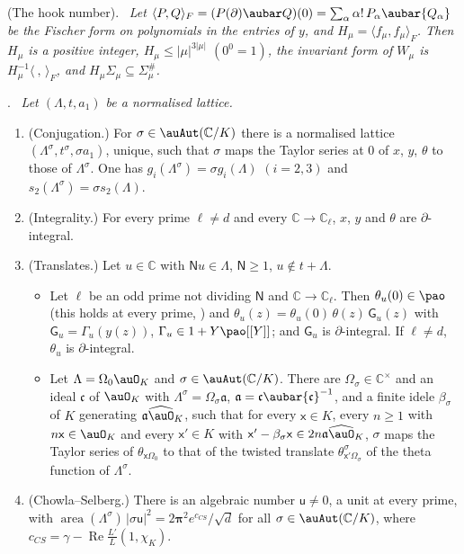 \documentclass[10pt]{amsart}
\theoremstyle{definition}
\theoremstyle{remark}
\newcommand{\C}{\mathbb C}
\newcommand{\Rel}{\operatorname{Re}}
\newenvironment{quotedthm}[2]{\par\medskip\noindent\begingroup
  \textbf{#1}#2.\ \itshape\ignorespaces}{\endgroup\par\medskip}
\begin{document}
\begin{quotedthm}{\cite[Lemma~5.22]{P49}}{ (The hook number)}
Let $\langle P,Q\rangle_F=(P(\partial)\aubar Q)(0)=\sum_\alpha\alpha!\,P_\alpha\aubar{Q_\alpha}$ be the
Fischer form on polynomials in the entries of $y$, and $H_\mu=\langle f_\mu,f_\mu\rangle_F$. Then
$H_\mu$ is a positive integer, $H_\mu\le|\mu|^{3|\mu|}$ $(0^0=1)$, the invariant form of $W_\mu$ is
$H_\mu^{-1}\langle\ ,\,\rangle_F$, and $H_\mu\Sigma_\mu\subseteq\Sigma_\mu^\#$.
\end{quotedthm}

\begin{quotedthm}{\cite[Proposition~5.25]{P49}}{}
Let $(\Lambda,t,a_1)$ be a normalised lattice.
\begin{enumerate}
\item[(C1)] {\rm(Conjugation.)} For $\sigma\in\auAut(\C/K)$ there is a normalised lattice
$(\Lambda^\sigma,t^\sigma,\sigma a_1)$, unique, such that $\sigma$ maps the Taylor series at $0$ of
$x$, $y$, $\theta$ to those of $\Lambda^\sigma$. One has $g_i(\Lambda^\sigma)=\sigma g_i(\Lambda)$
$(i=2,3)$ and $s_2(\Lambda^\sigma)=\sigma s_2(\Lambda)$.
\item[(C2)] {\rm(Integrality.)} For every prime $\ell\ne d$ and every $\C\to\C_\ell$, $x$, $y$ and
$\theta$ are $\partial$-integral.
\item[(C3)] {\rm(Translates.)} Let $u\in\C$ with $\mathsf Nu\in\Lambda$, $\mathsf N\ge1$,
$u\notin t+\Lambda$.
\begin{itemize}
\item[(i)] Let $\ell$ be an odd prime not dividing $\mathsf N$ and $\C\to\C_\ell$. Then
$\theta_u(0)\in\pao$ (this holds at every prime, {\cite[Proposition~7.5]{P49}}) and $\theta_u(z)=\theta_u(0)\,\theta(z)\,\mathsf G_u(z)$ with
$\mathsf G_u=\Gamma_u(y(z))$, $\Gamma_u\in1+Y\pao[[Y]]$; and $\mathsf G_u$ is $\partial$-integral.
If $\ell\ne d$, $\theta_u$ is $\partial$-integral.
\item[(ii)] Let $\Lambda=\Omega_0\auO_K$ and $\sigma\in\auAut(\C/K)$. There are $\Omega_\sigma\in\C^\times$ and an ideal $\mathfrak c$ of $\auO_K$ with
$\Lambda^\sigma=\Omega_\sigma\mathfrak a$, $\mathfrak a=\mathfrak c\aubar{\mathfrak c}^{-1}$, and a finite idele
$\beta_\sigma$ of $K$ generating $\mathfrak a\widehat\auO_K$, such that for every $\mathsf x\in K$, every $n\ge1$
with $n\mathsf x\in\auO_K$ and every $\mathsf x'\in K$ with $\mathsf x'-\beta_\sigma\mathsf x\in2n\mathfrak a\widehat\auO_K$,
$\sigma$ maps the Taylor series of $\theta_{\mathsf x\Omega_0}$ to that of the twisted translate
$\theta^\sigma_{\mathsf x'\Omega_\sigma}$ of the theta function of $\Lambda^\sigma$.
\end{itemize}
\item[(C4)] {\rm(Chowla--Selberg.)} There is an algebraic number $\mathsf u\ne0$, a unit at every prime, with $\operatorname{area}(\Lambda^\sigma)\,|\sigma\mathsf u|^2=2\boldsymbol\pi^2e^{c_{CS}}/
\sqrt d$ for all $\sigma\in\auAut(\C/K)$, where $c_{CS}=\gamma-\Rel\frac{L'}L(1,\chi_K)$.
\end{enumerate}
\end{quotedthm}
\end{document}
